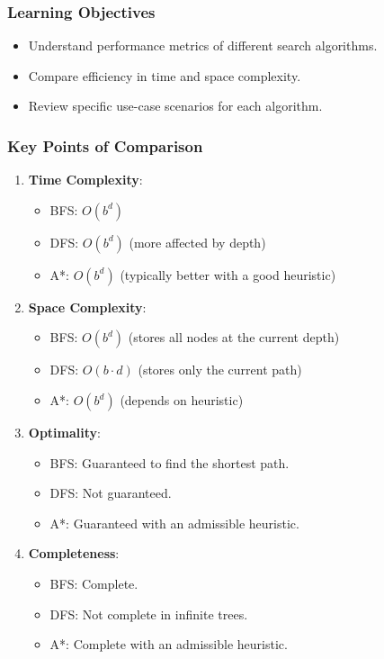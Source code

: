 \documentclass[aspectratio=169]{beamer}
\begin{document}
\begin{frame}[fragile]
    \frametitle{Learning Objectives}
    \begin{itemize}
        \item Understand performance metrics of different search algorithms.
        \item Compare efficiency in time and space complexity.
        \item Review specific use-case scenarios for each algorithm.
    \end{itemize}
\end{frame}

\begin{frame}[fragile]
    \frametitle{Key Points of Comparison}
    \begin{enumerate}
        \item \textbf{Time Complexity}:
        \begin{itemize}
            \item BFS: $O(b^d)$
            \item DFS: $O(b^d)$ (more affected by depth)
            \item A*: $O(b^d)$ (typically better with a good heuristic)
        \end{itemize}
        
        \item \textbf{Space Complexity}:
        \begin{itemize}
            \item BFS: $O(b^d)$ (stores all nodes at the current depth)
            \item DFS: $O(b \cdot d)$ (stores only the current path)
            \item A*: $O(b^d)$ (depends on heuristic)
        \end{itemize}
        
        \item \textbf{Optimality}:
        \begin{itemize}
            \item BFS: Guaranteed to find the shortest path.
            \item DFS: Not guaranteed.
            \item A*: Guaranteed with an admissible heuristic.
        \end{itemize}
        
        \item \textbf{Completeness}:
        \begin{itemize}
            \item BFS: Complete.
            \item DFS: Not complete in infinite trees.
            \item A*: Complete with an admissible heuristic.
        \end{itemize}
    \end{enumerate}
\end{frame}
\end{document}
